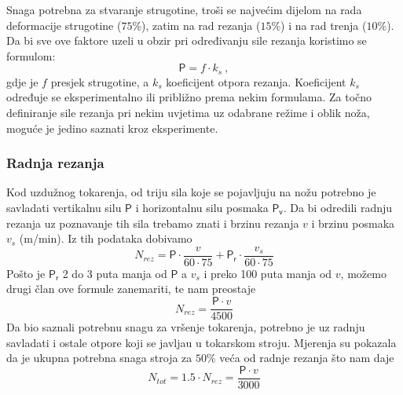 \documentclass[a4paper,12pt]{article}
\numberwithin{figure}{section}
\begin{document}
Snaga potrebna za stvaranje strugotine, troši se najvećim dijelom na rada deformacije strugotine ($75\%$), zatim na rad rezanja ($15\%$) i na rad trenja ($10\%$).
Da bi sve ove faktore uzeli u obzir pri određivanju sile rezanja koristimo se formulom:
\begin{equation}
\mathsf{P} = f \cdot k_{s}\:,
\end{equation}
gdje je $f$ presjek strugotine, a $k_{s}$ koeficijent otpora rezanja. Koeficijent $k_{s}$ određuje se eksperimentalno ili približno prema nekim formulama.
Za točno definiranje sile rezanja pri nekim uvjetima uz odabrane režime i oblik noža, moguće je jedino saznati kroz eksperimente.
\subsubsection{Radnja rezanja}
Kod uzdužnog tokarenja, od triju sila koje se pojavljuju na nožu potrebno je savladati vertikalnu silu $\mathsf{P}$ i horizontalnu silu posmaka $\mathsf{P_{v}}$. Da bi odredili radnju rezanja uz poznavanje tih sila trebamo znati i brzinu rezanja $v$ i brzinu posmaka $v_{s}$ (m/min). Iz tih podataka dobivamo
\begin{equation}
N_{rez} = \mathsf{P} \cdot \frac{v}{60 \cdot 75} + \mathsf{P_{r}} \cdot \frac{v_{s}}{60 \cdot 75}
\end{equation}
Pošto je $\mathsf{P_{r}}$ 2 do 3 puta manja od $\mathsf{P}$ a $v_{s}$ i preko 100 puta manja od $v$, možemo drugi član ove formule zanemariti, te nam preostaje
\begin{equation}
N_{rez} = \frac{\mathsf{P} \cdot v}{4500}
\end{equation}
Da bio saznali potrebnu snagu za vršenje tokarenja, potrebno je uz radnju savladati i ostale otpore koji se javljau u tokarskom stroju. Mjerenja su pokazala da je ukupna potrebna snaga stroja za $50\%$ veća od radnje rezanja što nam daje 
\begin{equation}
N_{tot} =1.5 \cdot N_{rez} = \frac{\mathsf{P} \cdot v}{3000}
\end{equation}
\end{document}
